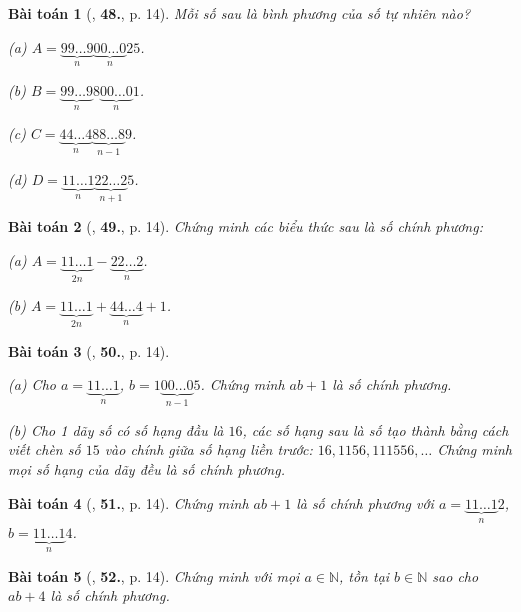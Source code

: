 \documentclass{article}
\numberwithin{equation}{section}
\newtheorem{baitoan}{Bài toán}[section]
\begin{document}
\begin{baitoan}[\cite{Binh_Toan_8_tap_1}, \textbf{48.}, p. 14]
	Mỗi số sau là bình phương của số tự nhiên nào?
	\begin{enumerate*}
		\item[(a)] $A = \underbrace{99\ldots 9}_n\underbrace{00\ldots 0}_n25$.
		\item[(b)] $B = \underbrace{99\ldots 9}_n8\underbrace{00\ldots 0}_n1$.
		\item[(c)] $C = \underbrace{44\ldots 4}_n\underbrace{88\ldots 8}_{n-1}9$.
		\item[(d)] $D = \underbrace{11\ldots 1}_n\underbrace{22\ldots 2}_{n+1}5$.
	\end{enumerate*}
\end{baitoan}

\begin{baitoan}[\cite{Binh_Toan_8_tap_1}, \textbf{49.}, p. 14]
	Chứng minh các biểu thức sau là số chính phương:
	\begin{enumerate*}
		\item[(a)] $A = \underbrace{11\ldots 1}_{2n} - \underbrace{22\ldots 2}_n$.
		\item[(b)] $A = \underbrace{11\ldots 1}_{2n} + \underbrace{44\ldots 4}_n + 1$.
	\end{enumerate*}
\end{baitoan}

\begin{baitoan}[\cite{Binh_Toan_8_tap_1}, \textbf{50.}, p. 14]
	\begin{enumerate*}
		\item[(a)] Cho $a = \underbrace{11\ldots 1}_n$, $b = 1\underbrace{00\ldots 0}_{n-1}5$. Chứng minh $ab + 1$ là số chính phương.
		\item[(b)] Cho 1 dãy số có số hạng đầu là $16$, các số hạng sau là số tạo thành bằng cách viết chèn số $15$ vào chính giữa số hạng liền trước: $16,1156,111556,\ldots$ Chứng minh mọi số hạng của dãy đều là số chính phương.
	\end{enumerate*}
\end{baitoan}

\begin{baitoan}[\cite{Binh_Toan_8_tap_1}, \textbf{51.}, p. 14]
	Chứng minh $ab + 1$ là số chính phương với $a = \underbrace{11\ldots 1}_n2$, $b = \underbrace{11\ldots 1}_n4$.
\end{baitoan}

\begin{baitoan}[\cite{Binh_Toan_8_tap_1}, \textbf{52.}, p. 14]
	Chứng minh với mọi $a\in\mathbb{N}$, tồn tại $b\in\mathbb{N}$ sao cho $ab + 4$ là số chính phương.
\end{baitoan}
\end{document}
